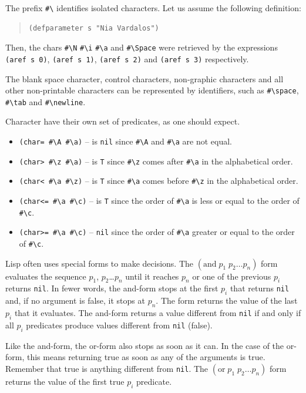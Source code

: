\documentclass[a4paper,12pt]{book}
\begin{document}
The prefix \verb|#\| identifies isolated characters. Let us
assume the following definition:
\begin{quote}
\begin{verbatim}
(defparameter s "Nia Vardalos")
\end{verbatim}
\end{quote}
Then, the chars \verb|#\N| \verb|#\i|  \verb|#\a| and
\verb|#\Space| were retrieved by the expressions
\verb|(aref s 0)|, \verb|(aref s 1)|, \verb|(aref s 2)|
and \verb|(aref s 3)| respectively.

The blank space character,  control
characters, non-graphic characters
and all other non-printable characters
can be represented by
identifiers, such as \verb|#\space|,
\verb|#\tab| and \verb|#\newline|.

\pagebreak
Character have their own set of predicates, as one
should expect.
\begin{itemize}
\item\verb|(char= #\A #\a)| -- is \verb|nil|
since \verb|#\A| and \verb|#\a| are not equal.
\item\verb|(char> #\z #\a)| -- is \verb|T|
since \verb|#\z|  comes after \verb|#\a| in the
alphabetical order.
\item\verb|(char< #\a #\z)| -- is \verb|T|
since \verb|#\a| comes before \verb|#\z|
in the alphabetical order.
\item\verb|(char<= #\a #\c)| -- is \verb|T| since
the order of \verb|#\a| is less or equal to
the order of \verb|#\c|.
\item\verb|(char>= #\a #\c)| -- \verb|nil| since
the order of \verb|#\a| greater or equal to the
order of \verb|#\c|.
\end{itemize}

Lisp often uses special forms to make decisions.
The $(\textrm{and}\; p_1\; p_2\ldots p_n)$ form
evaluates the sequence $p_1$, $p_2$\ldots $p_n$
until it reaches $p_n$ or one of the previous
$p_i$ returns \verb|nil|. In fewer words,
the and-form stops at the first
$p_i$ that returns \verb|nil| and, if no
argument is false, it stops at $p_n$.
The form returns the value of the last
$p_i$ that it evaluates. The and-form
returns a value different from \verb|nil|
if and only if all $p_i$ predicates produce
values different from \verb|nil| (false).

Like the and-form, the or-form also stops
as soon as it can. In the case of the or-form,
this means returning true as soon as any
of the arguments is true. Remember that
true is anything different from \verb|nil|.
The  $(\textrm{or}\; p_1\;
p_2\ldots p_n)$ form returns the value
of the first true $p_i$ predicate.
\end{document}

